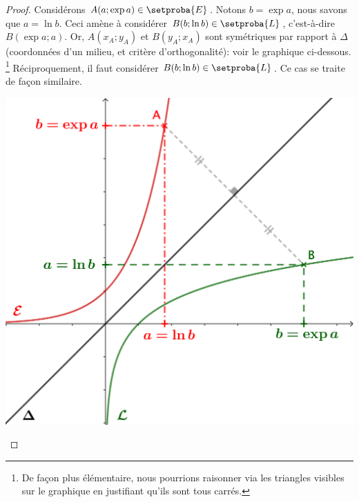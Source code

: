 \begin{proof}
	Considérons $A(a;\exp a) \in \setproba{E}$.
	Notons $b = \exp a$, nous savons que $a = \ln b$.
	Ceci amène à considérer $B(b;\ln b) \in \setproba{L}$,
	c'est-à-dire $B(\exp a;a)$.
	Or,
	$A(x_A;y_A)$ et $B(y_A;x_A)$ sont symétriques par rapport à $\Delta$
	(coordonnées d'un milieu, et critère d'orthogonalité):
	voir le graphique ci-dessous.%
	\footnote{
		De façon plus élémentaire, nous pourrions raisonner via les triangles visibles sur le graphique en justifiant qu'ils sont tous carrés.
	}
	Réciproquement, il faut considérer $B(b;\ln b) \in \setproba{L}$.
	Ce cas se traite de façon similaire.


	\begin{center}
		\includegraphics[scale=.85]{content/exp/graph.png}
	\end{center}
\end{proof}
